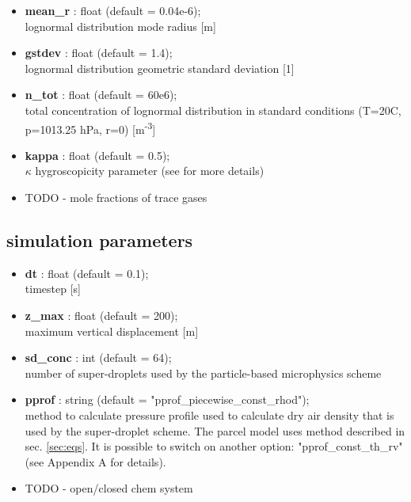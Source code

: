 \documentclass[11pt]{article}
\begin{document}
\begin{itemize}

  \item \textbf{mean\_r} : float (default = 0.04e-6);\\ lognormal distribution mode radius [m]
  \item \textbf{gstdev} : float (default = 1.4);\\ lognormal distribution geometric standard deviation [1]
  \item \textbf{n\_tot} : float (default = 60e6);\\ total concentration of lognormal distribution in standard conditions 
                               (T=20C, p=1013.25 hPa, r=0) [m\textsuperscript{-3}]
  \item \textbf{kappa} : float (default = 0.5);\\ $\kappa$ hygroscopicity parameter (see \citep{Petters_et_al_2007} for more details)
  \item{TODO - mole fractions of trace gases}

\end{itemize}

\subsection{simulation parameters}\label{sec:simpar}

\begin{itemize}

  \item \textbf{dt} : float (default = 0.1); \\ timestep [s]
  \item \textbf{z\_max} : float (default = 200); \\ maximum vertical displacement [m]
  \item \textbf{sd\_conc} : int (default = 64); \\ number of super-droplets used by the particle-based microphysics scheme
  \item \textbf{pprof} : string (default = "pprof\_piecewise\_const\_rhod"); \\ 
                method to calculate pressure profile used to calculate 
                dry air density that is used by the super-droplet scheme. The parcel model uses method described in sec. \ref{sec:eqs}. It is possible to switch on another option: "pprof\_const\_th\_rv" (see Appendix A for details).
  \item TODO - open/closed chem system
\end{itemize}
\end{document}
